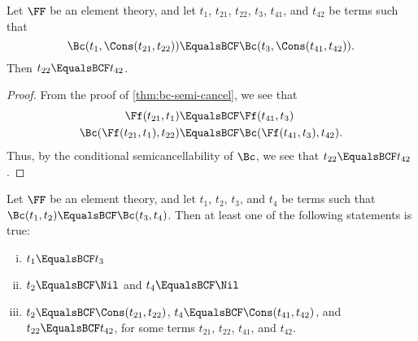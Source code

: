 \begin{Corollary}\label{cor:bc-eq-tail}
    Let $\FF$ be an element theory, and let $t_1$, $t_{21}$, $t_{22}$, $t_3$,
    $t_{41}$, and $t_{42}$ be terms such that
    \[\Bc(t_1, \Cons(t_{21}, t_{22})) \EqualsBCF \Bc(t_3, \Cons(t_{41}, t_{42})).\]
    Then $t_{22} \EqualsBCF t_{42}$.
\end{Corollary}

\begin{proof}
    From the proof of \cref{thm:bc-semi-cancel}, we see that
    \begin{align*}
        \Ff(t_{21}, t_1) &\EqualsBCF \Ff(t_{41}, t_3) \\
        \Bc(\Ff(t_{21}, t_1), t_{22}) &\EqualsBCF \Bc(\Ff(t_{41}, t_3), t_{42}).
    \end{align*}
    Thus, by the conditional semicancellability of $\Bc$, we see that $t_{22}
    \EqualsBCF t_{42}$.
\end{proof}

\begin{Theorem}\label{thm:bc-eq-cases}
    Let $\FF$ be an element theory, and let $t_1$, $t_2$, $t_3$, and $t_4$ be
    terms such that $\Bc(t_1, t_2) \EqualsBCF \Bc(t_3, t_4)$. Then at least one
    of the following statements is true:
    \begin{enumerate}[(i)]
        \item $t_1 \EqualsBCF t_3$
        \item $t_2 \EqualsBCF \Nil$ and $t_4 \EqualsBCF \Nil$
        \item $t_2 \EqualsBCF \Cons(t_{21}, t_{22})$, $t_4 \EqualsBCF
            \Cons(t_{41}, t_{42})$, and $t_{22} \EqualsBCF t_{42}$, for
            some terms $t_{21}$, $t_{22}$, $t_{41}$, and $t_{42}$.
    \end{enumerate}
\end{Theorem}

